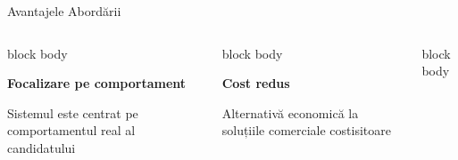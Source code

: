 \documentclass[aspectratio=169,9pt]{beamer}
\begin{document}
\begin{frame}{Avantajele Abordării}
        \vspace{-0.6cm}
        \begin{columns}[T]
                        \begin{beamercolorbox}[rounded=true,shadow=true,sep=1em]{block body}
                                \begin{center}
                                        {\fontsize{24}{24}\selectfont\textcolor{mainblue}{\faUser}}
                                        \vspace{0.2cm}
                                        
                                        \textbf{Focalizare pe comportament}
                                        \vspace{0.1cm}
                                        
                                        \small Sistemul este centrat pe comportamentul real al candidatului
                                \end{center}
                        \end{beamercolorbox}
                        
                        \vspace{0.4cm}
                        
                        \begin{beamercolorbox}[rounded=true,shadow=true,sep=1em]{block body}
                                \begin{center}
                                        {\fontsize{24}{24}\selectfont\textcolor{mainblue}{\faCoins}}
                                        \vspace{0.2cm}
                                        
                                        \textbf{Cost redus}
                                        \vspace{0.1cm}
                                        
                                        \small Alternativă economică la soluțiile comerciale costisitoare
                                \end{center}
                        \end{beamercolorbox}
                        
                        \begin{beamercolorbox}[rounded=true,shadow=true,sep=1em]{block body}
                                \begin{center}
                                        {\fontsize{24}{24}\selectfont\textcolor{mainblue}{\faBolt}}
                                        \vspace{0.2cm}
                                        

\end{center}
\end{beamercolorbox}
\end{columns}
\end{frame}
\end{document}
